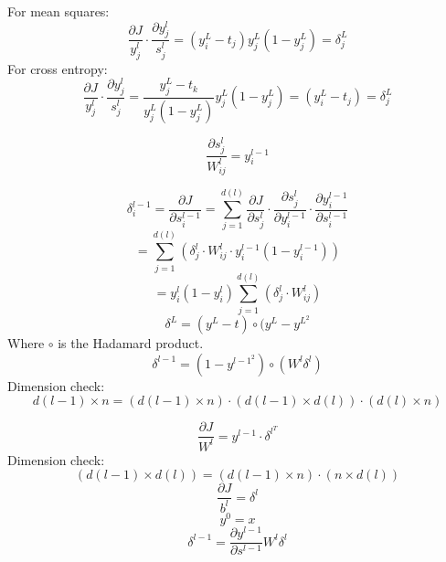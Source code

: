 \documentclass{article}
\begin{document}
For mean squares:
$$\dfrac{\partial{J}}{y_{j}^{l}}\cdot \dfrac{\partial{y_j^{l}}}{s_{j}^{l}} = (y_i^{L} - t_j)y_j^{L}(1-y_j^{L}) = \delta _j ^{L}$$
For cross entropy:
$$\dfrac{\partial{J}}{y_{j}^{l}}\cdot \dfrac{\partial{y_j^{l}}}{s_{j}^{l}} = \frac{y_j^{L} - t_k}{y_j^{L} (1 - y_j^{L})}y_j^{L}(1-y_j^{L}) = (y_i^{L} - t_j) = \delta_j^{L}$$

$$\dfrac{\partial{s_j^{l}}}{W_{ij}^{l}} = y_i^{l-1}$$

$$\delta_i^{l-1} = \dfrac{\partial{J}}{\partial{s_i^{l-1}}} = \sum_{j=1}^{d(l)}\dfrac{\partial{J}}{\partial{s_j^{l}}}\cdot\dfrac{\partial{s_j^{l}}}{\partial{y_{i}^{l-1}}}\cdot \dfrac{\partial{y_i^{l-1}}}{\partial{s_{i}^{l-1}}}$$
$$= \sum_{j=1}^{d(l)}(\delta_j^{l} \cdot W_{ij}^{l} \cdot y_i^{l-1}(1-y_i^{l-1}))$$
$$=y_i^{l}(1-y_i^{l})\sum_{j=1}^{d(l)}(\delta_j^{l} \cdot W_{ij}^{l})$$
$$\delta ^ {L} = (y^{L} - t)\circ (y^{L} - y^{L^2}$$
Where $\circ$ is the Hadamard product.
$$\delta^{l-1} = (1-y^{{l-1}^{2}})\circ (W^l\delta ^{l})$$
Dimension check:
$$d(l-1)\times n = (d(l-1)\times n) \cdot (d(l-1) \times d(l)) \cdot (d(l)\times n)$$

$$\dfrac{\partial{J}}{W^{l}} = y^{l-1} \cdot \delta^{l^T} $$
Dimension check:
$$(d(l-1) \times d(l)) = (d(l-1) \times n) \cdot (n \times d(l))$$
$$\dfrac{\partial{J}}{b^{l}} = \delta ^{l}$$
$$y^{0} = x$$
$$\delta ^{l-1} = \dfrac{\partial{y^{l-1}}}{\partial{s^{l-1}}}W^{l}\delta ^{l}$$
\end{document}

